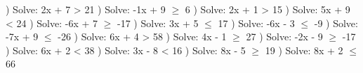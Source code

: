 \documentclass{article}%
\begin{document}
\newline%
) Solve: 2x + 7 > 21%
\newline%
\newline%
) Solve: -1x + 9 $\geq$ 6%
\newline%
\newline%
) Solve: 2x + 1 > 15%
\newline%
\newline%
) Solve: 5x + 9 < 24%
\newline%
\newline%
) Solve: -6x + 7 $\geq$ -17%
\newline%
\newline%
) Solve: 3x + 5 $\leq$ 17%
\newline%
\newline%
) Solve: -6x - 3 $\leq$ -9%
\newline%
\newline%
) Solve: -7x + 9 $\leq$ -26%
\newline%
\newline%
) Solve: 6x + 4 > 58%
\newline%
\newline%
) Solve: 4x - 1 $\geq$ 27%
\newline%
\newline%
) Solve: -2x - 9 $\geq$ -17%
\newline%
\newline%
) Solve: 6x + 2 < 38%
\newline%
\newline%
) Solve: 3x - 8 < 16%
\newline%
\newline%
) Solve: 8x - 5 $\geq$ 19%
\newline%
\newline%
) Solve: 8x + 2 $\leq$ 66%
\end{document}
